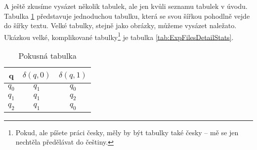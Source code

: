 \documentclass[bc,male,java,dept460]{diploma}		%
\begin{document}

A ještě zkusíme vysázet několik tabulek, ale jen kvůli seznamu tabulek v úvodu. Tabulka \ref{tab:ExpTable} představuje jednoduchou tabulku, která se svou šířkou pohodlně vejde do šířky textu. Velké tabulky, stejně jako obrázky, můžeme vysázet naležato. Ukázkou velké, komplikované tabulky\footnote{Pokud, ale píšete práci česky, měly by být tabulky také česky -- mě se jen nechtěla předělávat do češtiny.} je tabulka \ref{tab:ExpFilesDetailStats}.
 
\begin{table}
  \centering
  \begin{tabular}{|c|c|c|}
    \hline
    q & $\delta(q, 0)$ & $\delta(q, 1)$ \\
    \hline
    $q_0$ & $q_1$ & $q_0$ \\
    \hline
    $q_1$ & $q_1$ & $q_2$ \\
    \hline
    $q_2$ & $q_1$ & $q_0$ \\
    \hline
  \end{tabular}
  \caption{Pokusná tabulka}
  \label{tab:ExpTable}
\end{table}
\end{document}
